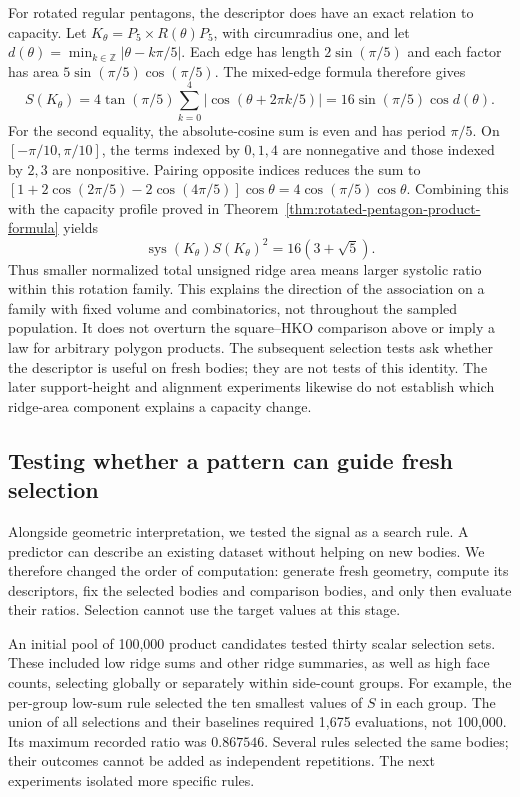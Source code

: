 For rotated regular pentagons, the descriptor does have an exact relation
to capacity. Let $K_\theta=P_5\times R(\theta)P_5$, with circumradius one,
and let $d(\theta)=\min_{k\in\mathbb Z}|\theta-k\pi/5|$.
Each edge has length $2\sin(\pi/5)$ and each factor has area
$5\sin(\pi/5)\cos(\pi/5)$. The mixed-edge formula therefore gives
\[
 S(K_\theta)=4\tan(\pi/5)
       \sum_{k=0}^4|\cos(\theta+2\pi k/5)|
     =16\sin(\pi/5)\cos d(\theta).
\]
For the second equality, the absolute-cosine sum is even and has period
$\pi/5$. On $[-\pi/10,\pi/10]$, the terms indexed by $0,1,4$ are
nonnegative and those indexed by $2,3$ are nonpositive. Pairing opposite
indices reduces the sum to
$[1+2\cos(2\pi/5)-2\cos(4\pi/5)]\cos\theta
=4\cos(\pi/5)\cos\theta$.
Combining this with the capacity profile proved in
Theorem~\ref{thm:rotated-pentagon-product-formula} yields
\begin{equation}\label{eq:ds-pentagon-ridge-capacity}
 \operatorname{sys}(K_\theta)S(K_\theta)^2=16(3+\sqrt5).
\end{equation}
Thus smaller normalized total unsigned ridge area means larger systolic
ratio within this rotation family. This explains the direction of the
association on a family with fixed volume and combinatorics, not throughout
the sampled population. It does not overturn the square--HKO comparison
above or imply a law for arbitrary polygon products. The subsequent selection
tests ask whether the descriptor is useful on fresh bodies; they are not
tests of this identity. The later support-height and alignment experiments
likewise do not establish which ridge-area component explains a capacity change.

\subsection{Testing whether a pattern can guide fresh selection}

Alongside geometric interpretation, we tested the signal as a search rule.
A predictor can describe an existing dataset without helping on new bodies. We
therefore changed the order of computation: generate fresh geometry, compute
its descriptors, fix the selected bodies and comparison bodies, and only then
evaluate their ratios. Selection cannot use the target values at this stage.

An initial pool of 100,000 product candidates tested thirty scalar selection
sets. These included low ridge sums and other ridge summaries, as well as
high face counts, selecting globally or separately within side-count groups.
For example, the per-group low-sum rule selected the ten smallest values of
$S$ in each group. The union of all selections and their baselines required
1,675 evaluations, not 100,000. Its maximum recorded ratio was $0.867546$.
Several rules selected the same bodies; their outcomes cannot be added as
independent repetitions. The next experiments isolated more specific rules.

